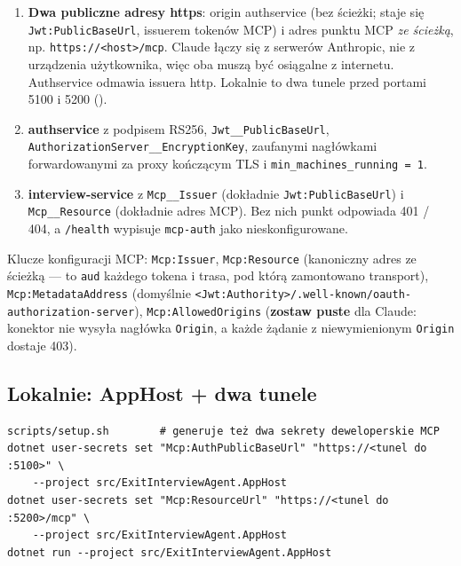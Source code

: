 {\begin{enumerate}[leftmargin=*,itemsep=2pt]
  \item \textbf{Dwa publiczne adresy https}: origin authservice (bez ścieżki;
        staje się \texttt{Jwt:\allowbreak{}PublicBaseUrl}, issuerem tokenów MCP) i adres punktu
        MCP \emph{ze ścieżką}, np. \texttt{https:\allowbreak{}/\allowbreak{}/\allowbreak{}<host>/\allowbreak{}mcp}. Claude łączy się
        z serwerów Anthropic, nie z urządzenia użytkownika, więc oba muszą być
        osiągalne z internetu. Authservice odmawia issuera http. Lokalnie to
        dwa tunele przed portami 5100 i 5200 ().
  \item \textbf{authservice} z podpisem RS256, \texttt{Jwt\_\allowbreak{}\_\allowbreak{}PublicBaseUrl},
        \texttt{AuthorizationServer\_\allowbreak{}\_\allowbreak{}EncryptionKey}, zaufanymi nagłówkami
        forwardowanymi za proxy kończącym TLS i
        \texttt{min\_\allowbreak{}machines\_\allowbreak{}running = 1}.
  \item \textbf{interview-service} z \texttt{Mcp\_\_Issuer} (dokładnie
        \texttt{Jwt:\allowbreak{}PublicBaseUrl}) i \texttt{Mcp\_\_Resource} (dokładnie adres
        MCP). Bez nich punkt odpowiada 401 / 404, a \texttt{/health} wypisuje
        \texttt{mcp-auth} jako nieskonfigurowane.
\end{enumerate}

Klucze konfiguracji MCP: \texttt{Mcp:Issuer}, \texttt{Mcp:Resource} (kanoniczny
adres ze ścieżką --- to \texttt{aud} każdego tokena i trasa, pod którą
zamontowano transport), \texttt{Mcp:\allowbreak{}MetadataAddress} (domyślnie
\texttt{<Jwt:\allowbreak{}Authority>/\allowbreak{}.well-\allowbreak{}known/\allowbreak{}oauth-\allowbreak{}authorization-\allowbreak{}server}),
\texttt{Mcp:\allowbreak{}AllowedOrigins} (\textbf{zostaw puste} dla Claude: konektor nie
wysyła nagłówka \texttt{Origin}, a każde żądanie z niewymienionym \texttt{Origin}
dostaje 403).

\subsection{Lokalnie: AppHost + dwa tunele}

\begin{Verbatim}[fontsize=\scriptsize,frame=single,framesep=2mm]
scripts/setup.sh        # generuje też dwa sekrety deweloperskie MCP
dotnet user-secrets set "Mcp:AuthPublicBaseUrl" "https://<tunel do :5100>" \
    --project src/ExitInterviewAgent.AppHost
dotnet user-secrets set "Mcp:ResourceUrl" "https://<tunel do :5200>/mcp" \
    --project src/ExitInterviewAgent.AppHost
dotnet run --project src/ExitInterviewAgent.AppHost
\end{Verbatim}

}

